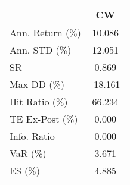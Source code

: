 \begin{tabular}{lc}
\toprule
{} &      CW \\
\midrule
Ann. Return (\%) &  10.086 \\
Ann. STD (\%)    &  12.051 \\
SR              &   0.869 \\
Max DD (\%)      & -18.161 \\
Hit Ratio (\%)   &  66.234 \\
TE Ex-Post (\%)  &   0.000 \\
Info. Ratio     &   0.000 \\
VaR (\%)         &   3.671 \\
ES (\%)          &   4.885 \\
\bottomrule
\end{tabular}
